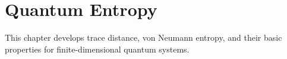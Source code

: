 
\chapter{Quantum Entropy}\label{ch:entropy}

This chapter develops trace distance, von Neumann entropy, and their basic
properties for finite-dimensional quantum systems.

